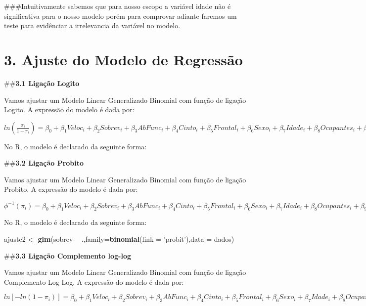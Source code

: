 \documentclass[]{article}
\newenvironment{Shaded}{\begin{snugshade}}{\end{snugshade}}
\newcommand{\KeywordTok}[1]{\textcolor[rgb]{0.13,0.29,0.53}{\textbf{#1}}}
\newcommand{\DataTypeTok}[1]{\textcolor[rgb]{0.13,0.29,0.53}{#1}}
\newcommand{\StringTok}[1]{\textcolor[rgb]{0.31,0.60,0.02}{#1}}
\newcommand{\OperatorTok}[1]{\textcolor[rgb]{0.81,0.36,0.00}{\textbf{#1}}}
\newcommand{\NormalTok}[1]{#1}
\begin{document}
\#\#\#Intuitivamente sabemos que para nosso escopo a variável idade não
é significativa para o nosso modelo porém para comprovar adiante faremos
um teste para evidênciar a irrelevancia da variável no modelo.

\hypertarget{ajuste-do-modelo-de-regressao}{%
\section{3. Ajuste do Modelo de
Regressão}\label{ajuste-do-modelo-de-regressao}}

\#\#\textbf{3.1 Ligação Logito}

Vamos ajustar um Modelo Linear Generalizado Binomial com função de
ligação Logito. A expressão do modelo é dada por:

\(ln (\frac{\pi_i}{1-\pi_i}) = \beta_0 + \beta_1 Veloc_i + \beta_2 Sobrev_i + \beta_3 AbFunc_i + \beta_4 Cinto_i + \beta_5 Frontal_i + \beta_6 Sexo_i + \beta_7 Idade_i + \beta_8 Ocupantes_i + \beta_9 Grav_i\)

No R, o modelo é declarado da seguinte forma:

\#\#\textbf{3.2 Ligação Probito}

Vamos ajustar um Modelo Linear Generalizado Binomial com função de
ligação Probito. A expressão do modelo é dada por:

\(\phi^{-1} (\pi_i) = \beta_0 + \beta_1 Veloc_i + \beta_2 Sobrev_i + \beta_3 AbFunc_i + \beta_4 Cinto_i + \beta_5 Frontal_i + \beta_6 Sexo_i + \beta_7 Idade_i + \beta_8 Ocupantes_i + \beta_9 Grav_i\)

No R, o modelo é declarado da seguinte forma:

\begin{Shaded}
\begin{Highlighting}[]
\NormalTok{ajuste2 <-}\StringTok{ }\KeywordTok{glm}\NormalTok{(sobrev }\OperatorTok{~}\StringTok{ }\NormalTok{.,}\DataTypeTok{family=}\KeywordTok{binomial}\NormalTok{(}\DataTypeTok{link =} \StringTok{'probit'}\NormalTok{),}\DataTypeTok{data =}\NormalTok{ dados)}
\end{Highlighting}
\end{Shaded}

\#\#\textbf{3.3 Ligação Complemento log-log}

Vamos ajustar um Modelo Linear Generalizado Binomial com função de
ligação Complemento Log Log. A expressão do modelo é dada por:

\(ln[-ln(1-\pi_i)] = \beta_0 + \beta_1 Veloc_i + \beta_2 Sobrev_i + \beta_3 AbFunc_i + \beta_4 Cinto_i + \beta_5 Frontal_i + \beta_6 Sexo_i + \beta_7 Idade_i + \beta_8 Ocupantes_i + \beta_9 Grav_i\)
\end{document}
